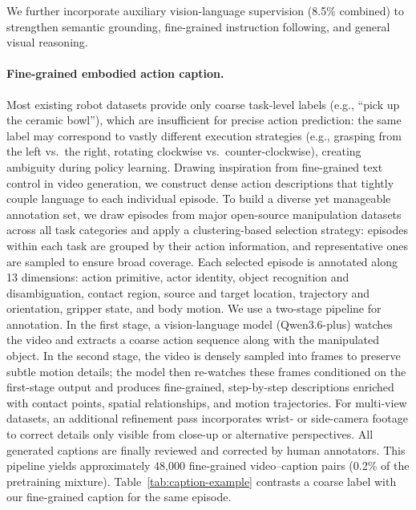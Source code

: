 \documentclass{llmxive}
\begin{document}
We further incorporate auxiliary vision-language supervision (8.5\% combined)
to strengthen semantic grounding, fine-grained instruction following, and
general visual reasoning.

\paragraph{Fine-grained embodied action caption.}
Most existing robot datasets provide only coarse task-level labels
(e.g., ``pick up the ceramic bowl''), which are insufficient for precise
action prediction: the same label may correspond to vastly different
execution strategies (e.g., grasping from the left vs.\ the right,
rotating clockwise vs.\ counter-clockwise), creating ambiguity during
policy learning. Drawing inspiration from fine-grained text control in
video generation, we construct dense action descriptions that tightly
couple language to each individual episode.
%
To build a diverse yet manageable annotation set, we draw episodes from
major open-source manipulation datasets across all task categories and
apply a clustering-based selection strategy: episodes within each task
are grouped by their action information, and representative ones are
sampled to ensure broad coverage.
%
Each selected episode is annotated along 13 dimensions: action primitive,
actor identity, object recognition and disambiguation, contact region,
source and target location, trajectory and orientation, gripper state,
and body motion. We use a two-stage pipeline for annotation.
In the first stage, a vision-language model (Qwen3.6-plus) watches the
video and extracts a coarse action sequence along with the manipulated
object. In the second stage, the video is densely sampled into frames
to preserve subtle motion details; the model then re-watches these
frames conditioned on the first-stage output and produces fine-grained,
step-by-step descriptions enriched with contact points, spatial
relationships, and motion trajectories.
For multi-view datasets, an additional refinement pass incorporates
wrist- or side-camera footage to correct details only visible from
close-up or alternative perspectives.
All generated captions are finally reviewed and corrected by human
annotators.
%
This pipeline yields approximately 48{,}000 fine-grained video--caption
pairs (0.2\% of the pretraining mixture).
Table~\ref{tab:caption-example} contrasts a coarse label with our
fine-grained caption for the same episode.
\end{document}
